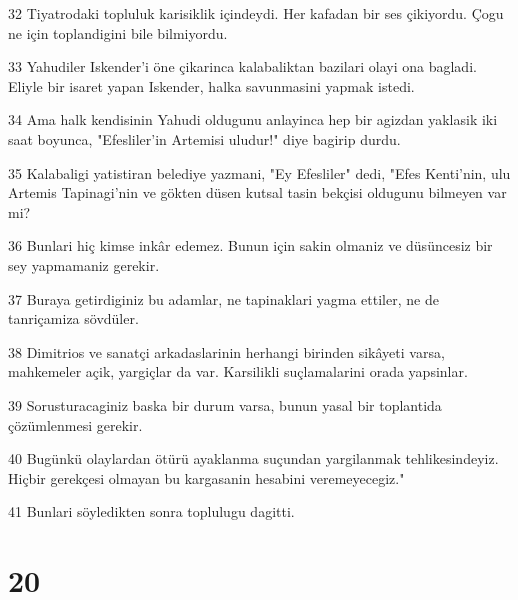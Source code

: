 \par 32 Tiyatrodaki topluluk karisiklik içindeydi. Her kafadan bir ses çikiyordu. Çogu ne için toplandigini bile bilmiyordu.
\par 33 Yahudiler Iskender'i öne çikarinca kalabaliktan bazilari olayi ona bagladi. Eliyle bir isaret yapan Iskender, halka savunmasini yapmak istedi.
\par 34 Ama halk kendisinin Yahudi oldugunu anlayinca hep bir agizdan yaklasik iki saat boyunca, "Efesliler'in Artemisi uludur!" diye bagirip durdu.
\par 35 Kalabaligi yatistiran belediye yazmani, "Ey Efesliler" dedi, "Efes Kenti'nin, ulu Artemis Tapinagi'nin ve gökten düsen kutsal tasin bekçisi oldugunu bilmeyen var mi?
\par 36 Bunlari hiç kimse inkâr edemez. Bunun için sakin olmaniz ve düsüncesiz bir sey yapmamaniz gerekir.
\par 37 Buraya getirdiginiz bu adamlar, ne tapinaklari yagma ettiler, ne de tanriçamiza sövdüler.
\par 38 Dimitrios ve sanatçi arkadaslarinin herhangi birinden sikâyeti varsa, mahkemeler açik, yargiçlar da var. Karsilikli suçlamalarini orada yapsinlar.
\par 39 Sorusturacaginiz baska bir durum varsa, bunun yasal bir toplantida çözümlenmesi gerekir.
\par 40 Bugünkü olaylardan ötürü ayaklanma suçundan yargilanmak tehlikesindeyiz. Hiçbir gerekçesi olmayan bu kargasanin hesabini veremeyecegiz."
\par 41 Bunlari söyledikten sonra toplulugu dagitti.

\chapter{20}

